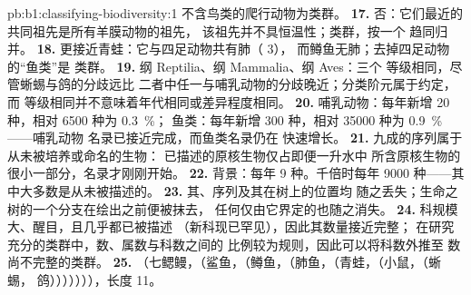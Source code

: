 \begin{solution}{pb:b1:classifying-biodiversity:1}
不含鸟类的爬行动物为类群。
\textbf{17.} 否：它们最近的共同祖先是所有羊膜动物的祖先，
该祖先并不具恒温性；类群，按一个
趋同归并。
\textbf{18.} 更接近青蛙：它与四足动物共有肺（ 3），
而鳟鱼无肺；去掉四足动物的“鱼类”是
类群。
\textbf{19.} 纲 Reptilia、纲 Mammalia、纲 Aves：三个
等级相同，尽管蜥蜴与鸽的分歧远比
二者中任一与哺乳动物的分歧晚近；分类阶元属于约定，而
等级相同并不意味着年代相同或差异程度相同。
\textbf{20.} 哺乳动物：每年新增 \num{20} 种，相对 \num{6500} 种为 \qty{0.3}{\%}；
鱼类：每年新增 \num{300} 种，相对 \num{35000} 种为 \qty{0.9}{\%}——哺乳动物
名录已接近完成，而鱼类名录仍在
快速增长。
\textbf{21.} 九成的序列属于从未被培养或命名的生物：
已描述的原核生物仅占即便一升水中
所含原核生物的很小一部分，名录才刚刚开始。
\textbf{22.} 背景：每年 \num{9} 种。千倍时每年 \num{9000}
种——其中大多数是从未被描述的。
\textbf{23.} 其、序列及其在树上的位置均
随之丢失；生命之树的一个分支在绘出之前便被抹去，
任何仅由它界定的也随之消失。
\textbf{24.} 科规模大、醒目，且几乎都已被描述
（新科现已罕见），因此其数量接近完整；
在研究充分的类群中，数、属数与科数之间的
比例较为规则，因此可以将科数外推至
数尚不完整的类群。
\textbf{25.} （七鳃鳗，（鲨鱼，（鳟鱼，（肺鱼，（青蛙，（小鼠，（蜥蜴，
鸽））））））），长度 \num{11}。
\end{solution}
